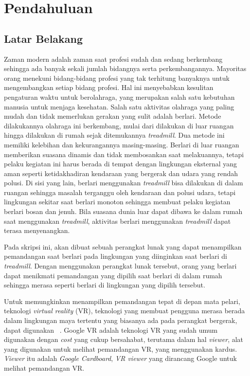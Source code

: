 \chapter{Pendahuluan}
\label{chap:intro}
   
\section{Latar Belakang}
\label{sec:label}

Zaman modern adalah zaman saat profesi sudah dan sedang berkembang sehingga ada banyak sekali jumlah bidangnya serta perkembangannya. Mayoritas orang menekuni bidang-bidang profesi yang tak terhitung banyaknya untuk mengembangkan setiap bidang profesi. Hal ini menyebabkan kesulitan pengaturan waktu untuk berolahraga, yang merupakan salah satu kebutuhan manusia untuk menjaga kesehatan. Salah satu aktivitas olahraga yang paling mudah dan tidak memerlukan gerakan yang sulit adalah berlari. Metode dilakukannya olahraga ini berkembang, mulai dari dilakukan di luar ruangan hingga dilakukan di rumah sejak ditemukannya {\it treadmill}. Dua metode ini memiliki kelebihan dan kekurangannya masing-masing. Berlari di luar ruangan memberikan suasana dinamis dan tidak membosankan saat melakuannya, tetapi pelaku kegiatan ini harus berada di tempat dengan lingkungan eksternal yang aman seperti ketidakhadiran kendaraan yang bergerak dan udara yang rendah polusi. Di sisi yang lain, berlari menggunakan \textit{treadmill} bisa dilakukan di dalam ruangan sehingga masalah terganggu oleh kendaraan dan polusi udara, tetapi lingkungan sekitar saat berlari monoton sehingga membuat pelaku kegiatan berlari bosan dan jenuh. Bila suasana dunia luar dapat dibawa ke dalam rumah saat menggunakan \textit{treadmill}, aktivitas berlari menggunakan \textit{treadmill} dapat terasa menyenangkan. 

Pada skripsi ini, akan dibuat sebuah perangkat lunak yang dapat menampilkan pemandangan saat berlari pada lingkungan yang diinginkan saat berlari di {\it treadmill}. Dengan menggunakan perangkat lunak tersebut, orang yang berlari dapat menikmati pemandangan yang dipilih saat berlari di dalam rumah sehingga merasa seperti berlari di lingkungan yang dipilih tersebut.

Untuk memungkinkan menampilkan pemandangan tepat di depan mata pelari, teknologi \textit{virtual reality} (VR), teknologi yang membuat pengguna merasa berada dalam lingkungan maya tertentu yang biasanya ada pada perangkat bergerak, dapat digunakan ~\cite{quickstart-google-vr}. Google VR adalah teknologi VR yang sudah umum digunakan dengan \textit{cost} yang cukup bersahabat, terutama dalam hal \textit{viewer}, alat yang digunakan untuk melihat pemandangan VR, yang menggunakan kardus. \textit{Viewer} itu adalah \textit{Google Cardboard}, \textit{VR viewer} yang dirancang Google untuk melihat pemandangan VR.

